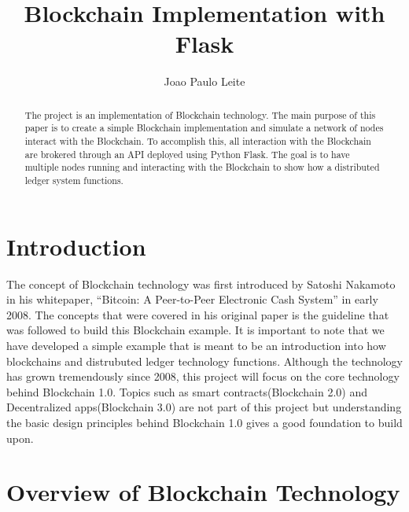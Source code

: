 
\title{Blockchain Implementation with Flask}


\author{Joao Paulo Leite}

\renewcommand{\shortauthors}{J. p. Leite}


\begin{abstract}
The project is an implementation of Blockchain technology. The main purpose of 
this paper is to create a simple Blockchain implementation and simulate a 
network of nodes interact with the Blockchain. To accomplish this, all 
interaction with the Blockchain are brokered through an API deployed using 
Python Flask. The goal is to have multiple nodes running and interacting with 
the Blockchain to show how a distributed ledger system functions.

\end{abstract}



\maketitle

\section{Introduction}

The concept of Blockchain technology was first introduced by Satoshi Nakamoto in
his whitepaper, “Bitcoin: A Peer-to-Peer Electronic Cash System” in early 2008. 
The concepts that were covered in his original paper is the guideline that was 
followed to build this Blockchain example. It is important to note that we have 
developed a simple example that is meant to be an introduction into how 
blockchains and distrubuted ledger technology functions. Although the 
technology has grown tremendously since 2008, this project will focus on the 
core technology behind Blockchain 1.0. Topics such as smart 
contracts(Blockchain 2.0) and Decentralized apps(Blockchain 3.0) are not part of 
this project but understanding the basic design principles behind Blockchain 1.0 
gives a good foundation to build upon. 

\section{Overview of Blockchain Technology}

